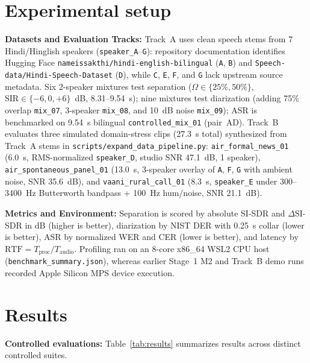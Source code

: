 \documentclass[11pt,a4paper,twocolumn]{article}
\begin{document}
\section{Experimental setup}
\noindent\textbf{Datasets and Evaluation Tracks:} Track~A uses clean speech stems from 7 Hindi/Hinglish speakers (\texttt{speaker\_A}--\texttt{G}): repository documentation identifies Hugging Face \texttt{nameissakthi/hindi-english-bilingual} (\texttt{A}, \texttt{B}) and \texttt{Speech-data/Hindi-Speech-Dataset} (\texttt{D}), while \texttt{C}, \texttt{E}, \texttt{F}, and \texttt{G} lack upstream source metadata. Six 2-speaker mixtures test separation ($\Omega \in \{25\%, 50\%\}$, $\text{SIR} \in \{-6, 0, +6\}$~dB, 8.31--9.54~s); nine mixtures test diarization (adding 75\% overlap \texttt{mix\_07}, 3-speaker \texttt{mix\_08}, and 10~dB noise \texttt{mix\_09}); ASR is benchmarked on 9.54~s bilingual \texttt{controlled\_mix\_01} (pair~AD). Track~B evaluates three simulated domain-stress clips (27.3~s total) synthesized from Track~A stems in \texttt{scripts/expand\_data\_pipeline.py}: \texttt{air\_formal\_news\_01} (6.0~s, RMS-normalized \texttt{speaker\_D}, studio SNR 47.1~dB, 1 speaker), \texttt{air\_spontaneous\_panel\_01} (13.0~s, 3-speaker overlay of \texttt{A}, \texttt{F}, \texttt{G} with ambient noise, SNR 35.6~dB), and \texttt{vaani\_rural\_call\_01} (8.3~s, \texttt{speaker\_E} under 300--3400~Hz Butterworth bandpass + 100~Hz hum/noise, SNR 21.1~dB).

\noindent\textbf{Metrics and Environment:} Separation is scored by absolute SI-SDR and $\Delta$SI-SDR in dB (higher is better), diarization by NIST DER with 0.25~s collar (lower is better), ASR by normalized WER and CER (lower is better), and latency by $\text{RTF} = T_{\text{proc}} / T_{\text{audio}}$. Profiling ran on an 8-core x86\_64 WSL2 CPU host (\texttt{benchmark\_summary.json}), whereas earlier Stage~1 M2 and Track~B demo runs recorded Apple Silicon MPS device execution.

\section{Results}
\noindent\textbf{Controlled evaluations:} Table~\ref{tab:results} summarizes results across distinct controlled suites.
\end{document}
